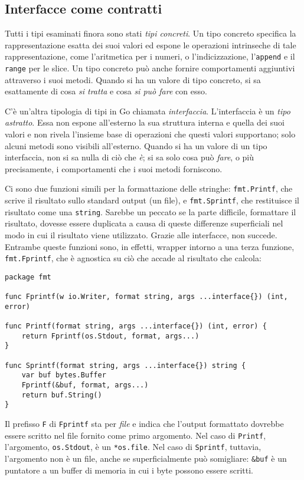 \documentclass[../../thesis.tex]{subfiles}
\begin{document}
    \subsection{Interfacce come contratti}\label{subsec:interfacce-come-contratti}
    Tutti i tipi esaminati finora sono stati \textit{tipi concreti}.
    Un tipo concreto specifica la rappresentazione esatta dei suoi valori ed espone le operazioni intrinseche di tale rappresentazione, come l'aritmetica per i numeri, o l'indicizzazione, l'\verb"append" e il \verb"range" per le slice.
    Un tipo concreto può anche fornire comportamenti aggiuntivi attraverso i suoi metodi.
    Quando si ha un valore di tipo concreto, si sa esattamente di cosa \textit{si tratta} e cosa \textit{si può fare} con esso.
    \hfill \vspace{12pt}

    C'è un'altra tipologia di tipi in Go chiamata \textit{interfaccia}.
    L'interfaccia è un \textit{tipo astratto}.
    Essa non espone all'esterno la sua struttura interna e quella dei suoi valori e non rivela l'insieme base di operazioni che questi valori supportano;
    solo alcuni metodi sono visibili all'esterno.
    Quando si ha un valore di un tipo interfaccia, non si sa nulla di ciò che \textit{è}; si sa solo cosa può \textit{fare}, o più precisamente, i comportamenti che i suoi metodi forniscono.
    \hfill \vspace{12pt}

    Ci sono due funzioni simili per la formattazione delle stringhe: \verb"fmt.Printf", che scrive il risultato sullo standard output (un file), e \verb"fmt.Sprintf", che restituisce il risultato come una \verb"string".
    Sarebbe un peccato se la parte difficile, formattare il risultato, dovesse essere duplicata a causa di queste differenze superficiali nel modo in cui il risultato viene utilizzato.
    Grazie alle interfacce, non succede.
    Entrambe queste funzioni sono, in effetti, wrapper intorno a una terza funzione, \verb"fmt.Fprintf", che è agnostica su ciò che accade al risultato che calcola:
    \begin{lstlisting}[frame = single, label = {lst:lstlisting6-1.1}]
package fmt

func Fprintf(w io.Writer, format string, args ...interface{}) (int, error)

func Printf(format string, args ...interface{}) (int, error) {
    return Fprintf(os.Stdout, format, args...)
}

func Sprintf(format string, args ...interface{}) string {
    var buf bytes.Buffer
    Fprintf(&buf, format, args...)
    return buf.String()
}
    \end{lstlisting}
    Il prefisso \verb"F" di \verb"Fprintf" sta per \textit{file} e indica che l'output formattato dovrebbe essere scritto nel file fornito come primo argomento.
    Nel caso di \verb"Printf", l'argomento, \verb"os.Stdout", è un \verb"*os.file".
    Nel caso di \verb"Sprintf", tuttavia, l'argomento non è un file, anche se superficialmente può somigliare: \verb"&buf" è un puntatore a un buffer di memoria in cui i byte possono essere scritti.
    \hfill \vspace{12pt}
    \clearpage
    \newpage
\end{document}
